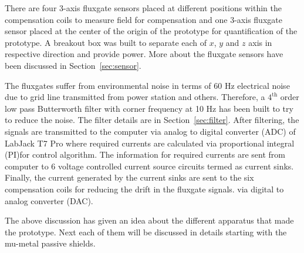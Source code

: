 There are four 3-axis fluxgate sensors placed at different positions within the compensation coils to measure field for compensation and one 3-axis fluxgate sensor placed at the center of the origin of the prototype for quantification of the prototype. A breakout box was built to separate each of $x$, $y$ and $z$ axis in respective direction and provide power. More about the fluxgate sensors have been discussed in Section~\ref{sec:sensor}.



\FloatBarrier
\clearpage
The fluxgates suffer from environmental noise in terms of 60 Hz electrical noise due to grid line transmitted from power station and others. Therefore, a $\mathrm{4^{th}}$ order low pass Butterworth filter with corner frequency at 10 Hz has been built to try to reduce the noise. The filter details are in Section~\ref{sec:filter}. After filtering, the signals are transmitted to the computer via analog to digital converter (ADC) of LabJack T7 Pro where required currents are calculated via proportional integral (PI)for control algorithm. The information for required currents are sent from computer to 6 voltage controlled current source circuits termed as current sinks. Finally, the current generated by the current sinks are sent to the six compensation coils for reducing the drift in the fluxgate signals.  via digital to analog converter (DAC).

The above discussion  has given an idea about the different apparatus that made the prototype. Next each of them will be discussed in details starting with  the mu-metal passive shields.

